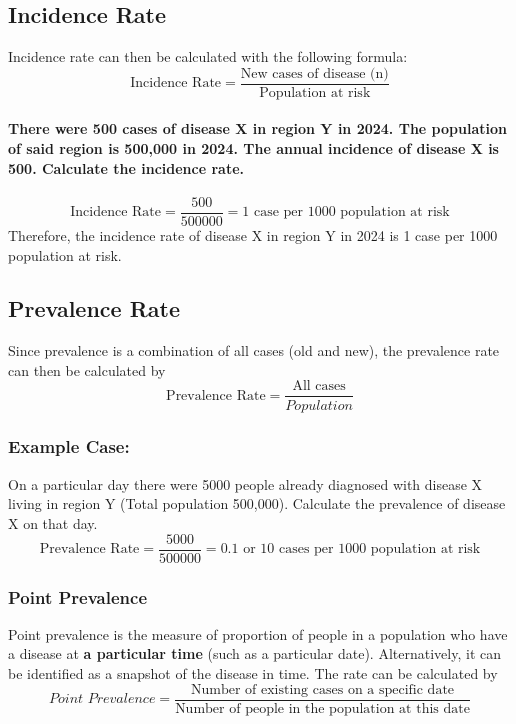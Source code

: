 \documentclass{article}
\begin{document}
\subsection{Incidence Rate}
Incidence rate can then be calculated with the following formula:
\begin{equation}
    \text{Incidence Rate} = \frac{\text{New cases of disease (n)}}{\text{Population at risk}}
\end{equation}

\paragraph{There were 500 cases of disease X in region Y in 2024. The population of said region is 500,000 in 2024.
The annual incidence of disease X is 500. Calculate the incidence rate.}
\begin{equation*}
    \text{Incidence Rate} = \frac{500}{500000} = \text{1 case per 1000 population at risk}
\end{equation*}
Therefore, the incidence rate of disease X in region Y in 2024 is 1 case per 1000 population at risk.

\subsection{Prevalence Rate}
Since prevalence is a combination of all cases (old and new), the prevalence rate can then be calculated by
\begin{equation}
    \text{Prevalence Rate} = \frac{\text{All cases}}{Population}
\end{equation}


\subsubsection*{Example Case:}
On a particular day there were 5000 people already diagnosed with disease X living in region Y (Total population 500,000).
Calculate the prevalence of disease X on that day.
\begin{equation*}
    \text{Prevalence Rate} = \frac{5000}{500000} = 0.1 \text{ or 10 cases per 1000 population at risk}
\end{equation*}

\subsubsection{Point Prevalence}
Point prevalence is the measure of proportion of people in a population who have a disease at \textbf{a particular time}
(such as a particular date). Alternatively, it can be identified as a snapshot of the disease in time. The rate
can be calculated by
\begin{equation*}
    \textit{Point Prevalence} = \frac{\text{Number of existing cases on a specific date}}{\text{Number of people in the population at this date}}
\end{equation*}
\end{document}
